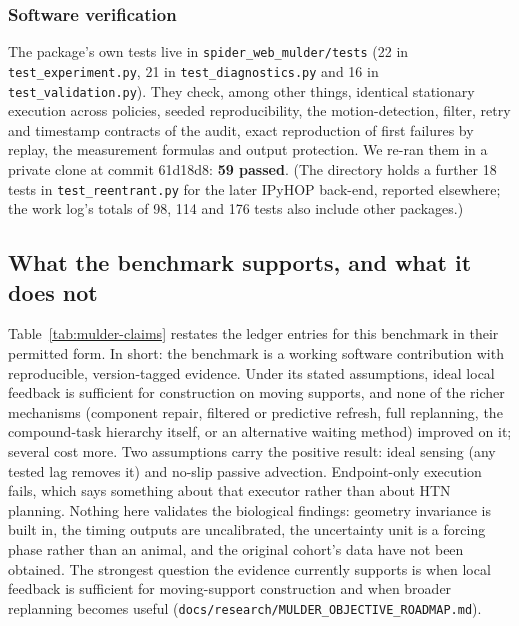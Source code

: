\subsubsection{Software verification}
\label{sec:mulder-tests}

The package's own tests live in \texttt{spider\_\allowbreak{}web\_\allowbreak{}mulder/\allowbreak{}tests}
(22 in \texttt{test\_\allowbreak{}experiment.py}, 21 in \texttt{test\_\allowbreak{}diagnostics.py} and 16 in
\texttt{test\_\allowbreak{}validation.py}). They check, among other things, identical
stationary execution across policies, seeded reproducibility, the motion-detection, filter, retry and
timestamp contracts of the audit, exact reproduction of first failures by replay, the measurement formulas
and output protection. We re-ran them in a private clone at commit 61d18d8: \textbf{59 passed}. (The
directory holds a further 18 tests in \texttt{test\_\allowbreak{}reentrant.py} for the later IPyHOP back-end, reported
elsewhere; the work log's totals of 98, 114 and 176 tests also include other packages.)

\subsection{What the benchmark supports, and what it does not}
\label{sec:mulder-claims}

Table~\ref{tab:mulder-claims} restates the ledger entries for this benchmark in their permitted form.
In short: the benchmark is a working software contribution with reproducible, version-tagged evidence.
Under its stated assumptions, ideal local feedback is sufficient for construction on moving supports, and
none of the richer mechanisms (component repair, filtered or predictive refresh, full replanning, the
compound-task hierarchy itself, or an alternative waiting method) improved on it; several cost more.
Two assumptions carry the positive result: ideal sensing (any tested lag removes it) and no-slip passive
advection. Endpoint-only execution fails, which says something about that executor rather than about HTN
planning. Nothing here validates the biological findings: geometry invariance is built in, the timing
outputs are uncalibrated, the uncertainty unit is a forcing phase rather than an animal, and the original
cohort's data have not been obtained. The strongest question the evidence currently supports is when local
feedback is sufficient for moving-support construction and when broader replanning becomes useful
(\texttt{docs/\allowbreak{}research/\allowbreak{}MULDER\_\allowbreak{}OBJECTIVE\_\allowbreak{}ROADMAP.md}).

